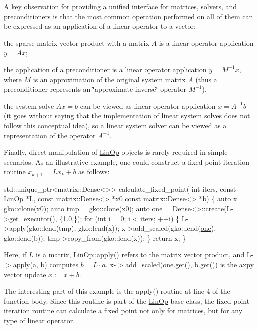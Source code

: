 A key observation for providing a unified interface for matrices, solvers, and preconditioners is that the most common operation performed on all of them can be expressed as an application of a linear operator to a vector\+:


\begin{DoxyItemize}
\item the sparse matrix-\/vector product with a matrix $A$ is a linear operator application $y = Ax$;
\item the application of a preconditioner is a linear operator application $y = M^{-1}x$, where $M$ is an approximation of the original system matrix $A$ (thus a preconditioner represents an \char`\"{}approximate
    inverse\char`\"{} operator $M^{-1}$).
\item the system solve $Ax = b$ can be viewed as linear operator application $x = A^{-1}b$ (it goes without saying that the implementation of linear system solves does not follow this conceptual idea), so a linear system solver can be viewed as a representation of the operator $A^{-1}$.
\end{DoxyItemize}

Finally, direct manipulation of \hyperlink{classgko_1_1LinOp}{Lin\+Op} objects is rarely required in simple scenarios. As an illustrative example, one could construct a fixed-\/point iteration routine $x_{k+1} = Lx_k + b$ as follows\+:


\begin{DoxyCode}
std::unique\_ptr<matrix::Dense<>> calculate\_fixed\_point(
        \textcolor{keywordtype}{int} iters, \textcolor{keyword}{const} LinOp *L, \textcolor{keyword}{const} matrix::Dense<> *x0
        \textcolor{keyword}{const} matrix::Dense<> *b)
\{
    \textcolor{keyword}{auto} x = gko::clone(x0);
    \textcolor{keyword}{auto} tmp = gko::clone(x0);
    \textcolor{keyword}{auto} \hyperlink{namespacegko_a0059e27f8f4bc348ff65c1e60caf47c8}{one} = Dense<>::create(L->get\_executor(), \{1.0,\});
    \textcolor{keywordflow}{for} (\textcolor{keywordtype}{int} i = 0; i < iters; ++i) \{
        L->apply(gko::lend(tmp), gko::lend(x));
        x->add\_scaled(gko::lend(\hyperlink{namespacegko_a0059e27f8f4bc348ff65c1e60caf47c8}{one}), gko::lend(b));
        tmp->copy\_from(gko::lend(x));
    \}
    \textcolor{keywordflow}{return} x;
\}
\end{DoxyCode}


Here, if $L$ is a matrix, \hyperlink{classgko_1_1LinOp_a0449b2fc705d2f970855af23b5e2788e}{Lin\+Op\+::apply()} refers to the matrix vector product, and {\ttfamily L-\/$>$apply(a, b)} computes $b = L \cdot a$. {\ttfamily x-\/$>$add\+\_\+scaled(one.\+get(), b.\+get())} is the {\ttfamily axpy} vector update $x:=x+b$.

The interesting part of this example is the apply() routine at line 4 of the function body. Since this routine is part of the \hyperlink{classgko_1_1LinOp}{Lin\+Op} base class, the fixed-\/point iteration routine can calculate a fixed point not only for matrices, but for any type of linear operator. 